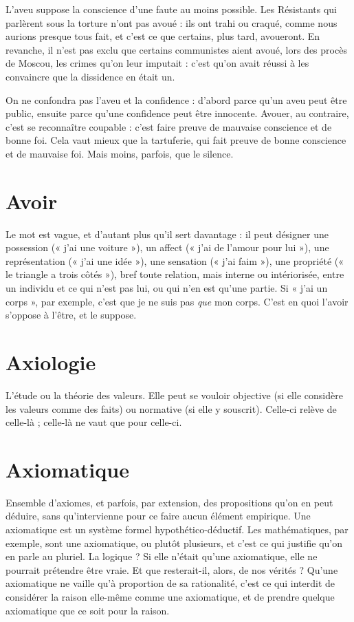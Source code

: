 L’aveu suppose la conscience d’une faute au moins possible. Les Résistants
qui parlèrent sous la torture n’ont pas avoué : ils ont trahi ou craqué, comme
nous aurions presque tous fait, et c’est ce que certains, plus tard, avoueront. En
revanche, il n’est pas exclu que certains communistes aient avoué, lors des
procès de Moscou, les crimes qu’on leur imputait : c’est qu’on avait réussi à les
convaincre que la dissidence en était un.

On ne confondra pas l’aveu et la confidence : d’abord parce qu’un aveu
peut être public, ensuite parce qu’une confidence peut être innocente. Avouer,
au contraire, c’est se reconnaître coupable : c’est faire preuve de mauvaise conscience
et de bonne foi. Cela vaut mieux que la tartuferie, qui fait preuve de
bonne conscience et de mauvaise foi. Mais moins, parfois, que le silence.

\section{Avoir}
Le mot est vague, et d’autant plus qu’il sert davantage : il peut désigner
une possession (« j’ai une voiture »), un affect (« j’ai de l'amour
pour lui »), une représentation (« j'ai une idée »), une sensation (« j'ai faim »),
une propriété (« le triangle a trois côtés »), bref toute relation, mais interne ou
intériorisée, entre un individu et ce qui n’est pas lui, ou qui n’en est qu’une
partie. Si « j'ai un corps », par exemple, c’est que je ne suis pas {\it que} mon corps.
C’est en quoi l'avoir s’oppose à l’être, et le suppose.

\section{Axiologie}
L'étude ou la théorie des valeurs. Elle peut se vouloir objective
(si elle considère les valeurs comme des faits) ou normative (si
elle y souscrit). Celle-ci relève de celle-là ; celle-là ne vaut que pour celle-ci.

\section{Axiomatique}
Ensemble d’axiomes, et parfois, par extension, des propositions
qu’on en peut déduire, sans qu’intervienne pour ce
faire aucun élément empirique. Une axiomatique est un système formel hypothético-déductif.
Les mathématiques, par exemple, sont une axiomatique, ou
plutôt plusieurs, et c’est ce qui justifie qu’on en parle au pluriel. La logique ? Si
elle n’était qu’une axiomatique, elle ne pourrait prétendre être vraie. Et que resterait-il,
alors, de nos vérités ?
Qu’une axiomatique ne vaille qu’à proportion de sa rationalité, c’est ce qui
interdit de considérer la raison elle-même comme une axiomatique, et de
prendre quelque axiomatique que ce soit pour la raison.

